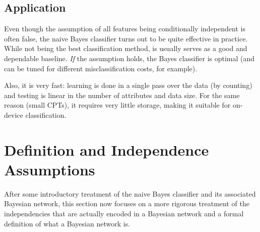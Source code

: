 		\subsection{Application}
			Even though the assumption of all features being conditionally independent is often false, the naive Bayes classifier turns out to be quite effective in practice. While not being the best classification method, is usually serves as a good and dependable baseline. \emph{If} the assumption holds, the Bayes classifier is optimal (and can be tuned for different misclassification costs, for example).

			Also, it is very fast: learning is done in a single pass over the data (by counting) and testing is linear in the number of attributes and data size. For the same reason (small CPTs), it requires very little storage, making it suitable for on-device classification.

	\section{Definition and Independence Assumptions}
		After some introductory treatment of the naive Bayes classifier and its associated Bayesian network, this section now focuses on a more rigorous treatment of the independencies that are actually encoded in a Bayesian network and a formal definition of what a Bayesian network is.

